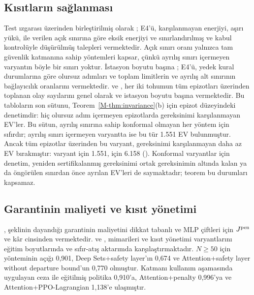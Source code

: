 \subsection{Kısıtların sağlanması}\label{app:res-constraints}

Test ızgarası üzerinden birleştirilmiş olarak ; E4'ü, karşılanmayan enerjiyi, aşırı yükü,  ile verilen açık sınırına göre eksik enerjiyi ve sınırlandırılmış ve kabul kontrolüyle düşürülmüş talepleri vermektedir.
Açık sınırı oranı yalnızca tam güvenlik katmanına sahip yöntemleri kapsar, çünkü ayrılış sınırı içermeyen varyantın böyle bir sınırı yoktur.
İstasyon boyutu başına ; E4'ü, yedek kural durumlarına göre olursuz adımları ve toplam limitlerin ve ayrılış alt sınırının bağlayıcılık oranlarını vermektedir.
 ve , her iki tohumun tüm epizotları üzerinden toplanan olay sayılarını genel olarak ve istasyon boyutu başına vermektedir.
Bu tabloların son sütunu, Teorem~\ref{M-thm:invariance}(b) için epizot düzeyindeki denetimdir: hiç olursuz adım içermeyen epizotlarda gereksinimi karşılanmayan EV'ler.
Bu sütun, ayrılış sınırına sahip konformal olmayan her yöntem için sıfırdır; ayrılış sınırı içermeyen varyantta ise bu tür 1.551 EV bulunmuştur.
Ancak tüm epizotlar üzerinden bu varyant, gereksinimi karşılanmayan daha az EV bırakmıştır: varyant için 1.551, \method{} için 6.158 ().
Konformal varyantlar için denetim, yeniden sertifikalanmış gereksinimi ortak gereksinimin altında kalan ya da öngörülen sınırdan önce ayrılan EV'leri de saymaktadır; teorem bu durumları kapsamaz.


\subsection{Garantinin maliyeti ve kısıt yönetimi}\label{app:res-ablation}

,  şeklinin dayandığı garantinin maliyetini dikkat tabanlı ve MLP çiftleri için $J^{\mathrm{pen}}$ ve kâr cinsinden vermektedir.
 ve , mimarileri ve kısıt yönetimi varyantlarını eğitim boyutlarında ve sıfır-atış aktarımda karşılaştırmaktadır.
$N\ge50$ için \method{} yönteminin açığı 0,901, Deep Sets+safety layer'ın 0,674 ve Attention+safety layer without departure bound'un 0,770 olmuştur.
Katmanı kullanım aşamasında uygulayan ceza ile eğitilmiş politika 0,910'a, Attention+penalty 0,996'ya ve Attention+PPO-Lagrangian 1,138'e ulaşmıştır.

